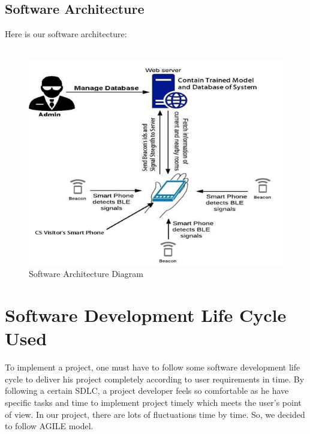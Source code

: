 \subsection{Software Architecture}
Here is our software architecture:
\\\\
\begin{figure}[h]
  		\centering
    		\includegraphics[scale=0.9]{./Figures/softarchi}
\caption{Software Architecture Diagram}
\label{fig:8}
 		\end{figure}


\section{Software Development Life Cycle Used}
To implement a project, one must have to follow some software development life cycle to deliver his project completely according to user requirements in time. By following a certain SDLC, a project developer feels so comfortable as he have specific tasks and time to implement project timely  which meets the user’s point of view. In our project, there are lots of fluctuations time by time. So, we decided to follow AGILE model.
